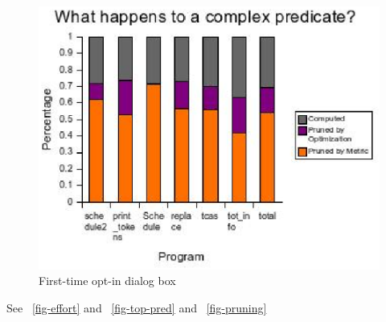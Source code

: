 \begin{figure}
  \centering
  \includegraphics[width=\columnwidth]{charts/pruning}
  \caption{First-time opt-in dialog box}
  \label{fig-pruning}
\end{figure}

See ~\autoref{fig-effort} and ~\autoref{fig-top-pred} and ~\autoref{fig-pruning}